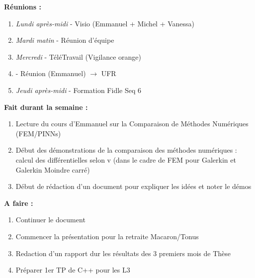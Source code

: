 \textbf{Réunions :}
\begin{enumerate}[label=\textbullet]
	\item \textit{Lundi après-midi} - Visio (Emmanuel + Michel + Vanessa)
	\item \textit{Mardi matin} - Réunion d'équipe
	\item \textit{Mercredi} - TéléTravail (Vigilance orange)
	\item {} - Réunion (Emmanuel) $\rightarrow$ UFR
	\item \textit{Jeudi après-midi} - Formation Fidle Seq 6
\end{enumerate}
\textbf{Fait durant la semaine :}
\begin{enumerate}[label=\textbullet]
	\item Lecture du cours d'Emmanuel sur la Comparaison de Méthodes Numériques (FEM/PINNs)
	\item Début des démonstrations de la comparaison des méthodes numériques : calcul des différentielles selon v (dans le cadre de FEM pour Galerkin et Galerkin Moindre carré)
	\item Début de rédaction d'un document pour expliquer les idées et noter le démos
\end{enumerate}
\textbf{A faire :}
\begin{enumerate}[label=\textbullet]
	\item Continuer le document
	\item Commencer la présentation pour la retraite Macaron/Tonus
	\item Redaction d'un rapport dur les résultats des 3 premiers mois de Thèse
	\item Préparer 1er TP de C++ pour les L3
\end{enumerate}